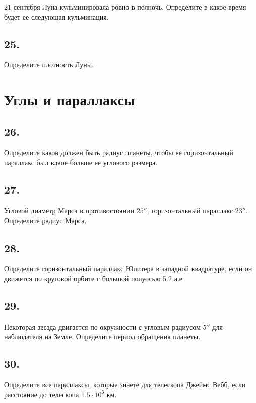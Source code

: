 \documentclass[a4paper,12pt]{article}
\begin{document}
$21$ сентября Луна кульминировала ровно в полночь. Определите в какое время будет ее следующая кульминация.

\subsection*{25.}

Определите плотность Луны.


\section*{Углы и параллаксы}

\subsection*{26.}

Определите каков должен быть радиус планеты, чтобы ее горизонтальный параллакс был вдвое больше ее углового размера.

\subsection*{27.}

Угловой диаметр Марса в противостоянии $25''$, горизонтальный параллакс
$23''$. Определите радиус Марса.

\subsection*{28.}

Определите горизонтальный параллакс Юпитера в западной квадратуре,
если он движется по круговой орбите с большой полуосью 5.2 а.е

\subsection*{29.}

Некоторая звезда двигается по окружности с угловым радиусом $5''$  для наблюдателя на Земле. Определите период обращения планеты. 

\subsection*{30.}

Определите все параллаксы, которые знаете для телескопа Джеймс Вебб, если расстояние до телескопа $1.5 \cdot 10^6$ км.

	
	
\end{document}
